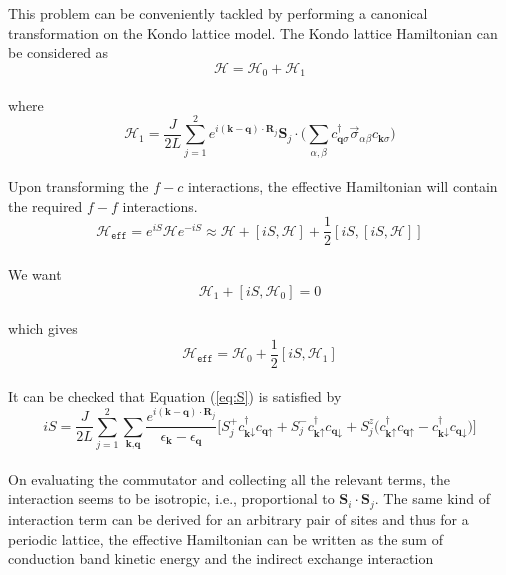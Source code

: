 \documentclass{article}
\begin{document}
This problem can be conveniently tackled by performing a canonical transformation on the Kondo lattice model. The Kondo lattice Hamiltonian can be considered as
\\
\begin{equation}
\mathcal{H} = \mathcal{H}_{0} + \mathcal{H}_{1}
\end{equation}
\\
where
\\
\begin{equation}
 \mathcal{H}_{1}= \frac{J}{2L}\sum_{j=1}^{2}e^{i(\textbf{k}-\textbf{q}) \cdot \textbf{R}_j} \textbf{S}_j \cdot \Bigg(\sum_{\alpha, \beta} c_{\textbf{q}\sigma}^\dagger \vec{\sigma}_{\alpha \beta} c_{\textbf{k}\sigma}\Bigg)
\end{equation}
\\
Upon transforming the $f-c$ interactions, the effective Hamiltonian will contain the required $f-f$ interactions. 
\\
\begin{equation}
\mathcal{H}_{\texttt{eff}} = e^{iS} \mathcal{H} e^{-iS} \approx \mathcal{H} + [iS, \mathcal{H}] + \frac{1}{2}[iS, [iS, \mathcal{H}]]
\end{equation}
\\
We want 
\\
\begin{equation}\label{eq:S}
\mathcal{H}_{1} + [iS, \mathcal{H}_0] = 0
\end{equation}
\\
which gives
\\
\begin{equation}
\mathcal{H}_{\texttt{eff}} = \mathcal{H}_0 + \frac{1}{2}[iS, \mathcal{H}_1]
\end{equation}
\\
It can be checked that Equation (\ref{eq:S}) is satisfied by 
\\
\begin{equation}
iS = \frac{J}{2L}\sum_{j=1}^{2}\sum_{\textbf{k}, \textbf{q}} \frac{e^{i(\textbf{k}-\textbf{q}) \cdot \textbf{R}_j}}{\epsilon_{\textbf{k}} - \epsilon_{\textbf{q}}} \Big[ S_j^+ c_{\textbf{k}\downarrow}^\dagger c_{\textbf{q}\uparrow} + S_j^- c_{\textbf{k}\uparrow}^\dagger c_{\textbf{q}\downarrow} + S_j^z \big( c_{\textbf{k}\uparrow}^\dagger c_{\textbf{q}\uparrow} - c_{\textbf{k}\downarrow}^\dagger c_{\textbf{q}\downarrow}\big)\Big]
\end{equation}
\\
On evaluating the commutator and collecting all the relevant terms, the interaction seems to be isotropic, i.e., proportional to $\textbf{S}_i \cdot \textbf{S}_j$. The same kind of interaction term can be derived for an arbitrary pair of sites and thus for a periodic lattice, the effective Hamiltonian can be written as the sum of conduction band kinetic energy and the indirect exchange interaction
\end{document}
